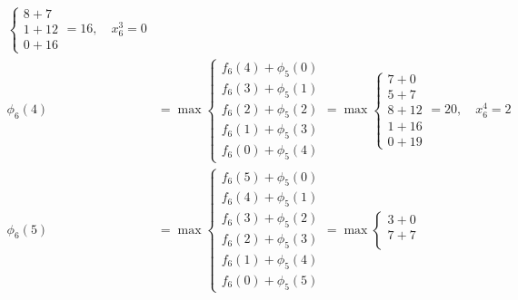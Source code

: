 \documentclass{article}
\begin{document}
\[\begin{aligned}
\begin{cases}
                                                  8 + 7  \\
                                                  1 + 12 \\
                                                  0 + 16
                                              \end{cases} = 16, \quad x_6^3 = 0               \\
        \phi_6(4) & = \max \begin{cases}
                               f_6(4) + \phi_5(0) \\
                               f_6(3) + \phi_5(1) \\
                               f_6(2) + \phi_5(2) \\
                               f_6(1) + \phi_5(3) \\
                               f_6(0) + \phi_5(4)
                           \end{cases} = \max \begin{cases}
                                                  7 + 0  \\
                                                  5 + 7  \\
                                                  8 + 12 \\
                                                  1 + 16 \\
                                                  0 + 19
                                              \end{cases} = 20, \quad x_6^4 = 2               \\
        \phi_6(5) & = \max \begin{cases}
                               f_6(5) + \phi_5(0) \\
                               f_6(4) + \phi_5(1) \\
                               f_6(3) + \phi_5(2) \\
                               f_6(2) + \phi_5(3) \\
                               f_6(1) + \phi_5(4) \\
                               f_6(0) + \phi_5(5)
                           \end{cases} = \max \begin{cases}
                                                  3 + 0  \\
                                                  7 + 7  \\

\end{cases}
\end{aligned}\]
\end{document}
